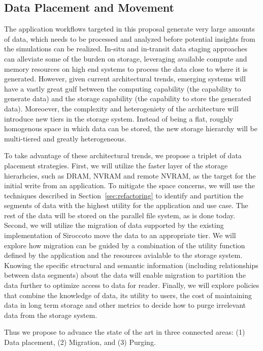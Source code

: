 \subsection{Data Placement and Movement}
\newcommand{\Sir}{Sirocco}

The application workflows targeted in this proposal generate very large
amounts of data, which needs to be processed and analyzed before
potential insights from the simulations can be realized. 
In-situ and in-transit data staging approaches can alleviate some of the
burden on storage, leveraging available compute and memory resources on high
end systems to process the data close to where it is generated. 
However, given current architectural trends, emerging systems will have a
vastly great gulf between the computing capability (the capability to
generate data) and the storage capability (the capability to store the
generated data). Moreoever, the complexity and heterogeniety of the
architecture will introduce new tiers in the storage system. Instead of
being a flat, roughly homogenous space in which data can be stored, the new
storage hierarchy will be multi-tiered and greatly heterogeneous. 

To take advantage of these architectural trends, we propose a triplet of
data placement strategies. First, we will utilize the faster layer of the
storage hierarhcies, such as DRAM, NVRAM and remote NVRAM, as the target for
the initial write from an application. To mitigate the space concerns, we
will use the techniques described in Section~\ref{sec:refactoring} to
identify and partition the segments of data with the highest utility for the
application and use case. The rest of the data will be stored on the
parallel file system, as is done today. Second, we will utilize the
migration of data supported by the existing implementation of \Sir to move the
data to an appropriate tier. We will explore how migration can be guided by
a combination of the utility function defined by the application and the
resources avialable to the storage system. Knowing the specific structural
and semantic information (including relationships between data segments)
about the data will enable migration to partition the data further to
optimize access to data for reader. 
Finally, we will explore policies that combine the knowledge of data, its
utility to users, the cost of maintaining data in long term storage and
other metrics to decide how to purge irrelevant data from the storage
system. 

Thus we propose to advance the state of the art in three connected areas:
(1) Data placement,
(2) Migration,
and (3) Purging. 

